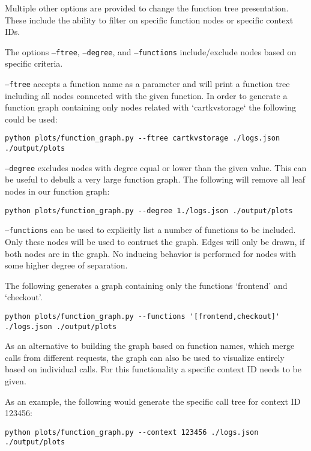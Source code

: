 \documentclass[../main.tex]{subfiles}
\begin{document}
Multiple other options are provided to change the function tree presentation. 
These include the ability to filter on specific function nodes or specific context IDs.

The options \texttt{--ftree}, \texttt{--degree}, and \texttt{--functions} include/exclude nodes based on specific criteria.

\texttt{--ftree} accepts a function name as a parameter and will print a function tree including all nodes connected with the given function.
In order to generate a function graph containing only nodes related with `cartkvstorage` the following could be used:
\begin{tcolorbox}
\begin{verbatim}
python plots/function_graph.py --ftree cartkvstorage ./logs.json 
./output/plots
\end{verbatim}
\end{tcolorbox}

\texttt{--degree} excludes nodes with degree equal or lower than the given value. 
This can be useful to debulk a very large function graph.
The following will remove all leaf nodes in our function graph:
\begin{tcolorbox}
\begin{verbatim}
python plots/function_graph.py --degree 1./logs.json ./output/plots
\end{verbatim}
\end{tcolorbox}



\texttt{--functions} can be used to explicitly list a number of functions to be included. 
Only these nodes will be used to contruct the graph. Edges will only be drawn, 
if both nodes are in the graph. 
No inducing behavior is performed for nodes with some higher degree of separation.

The following generates a graph containing only the functions `frontend' and `checkout'.
\begin{tcolorbox}
\begin{verbatim}
python plots/function_graph.py --functions '[frontend,checkout]' 
./logs.json ./output/plots
\end{verbatim}
\end{tcolorbox}

As an alternative to building the graph based on function names, 
which merge calls from different requests, 
the graph can also be used to visualize entirely based on individual calls. 
For this functionality a specific context ID needs to be given.

As an example, the following would generate the specific call tree for context ID 123456:
\begin{tcolorbox}
\begin{verbatim}
python plots/function_graph.py --context 123456 ./logs.json 
./output/plots
\end{verbatim}
\end{tcolorbox}
\end{document}
